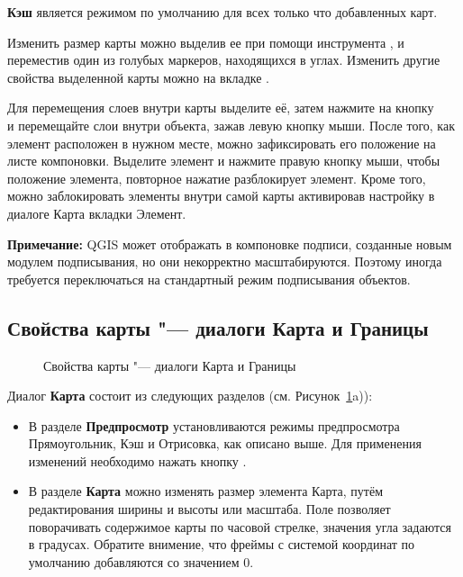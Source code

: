 \textbf{Кэш} является режимом по умолчанию для всех только что
добавленных карт.

Изменить размер карты можно выделив ее при помощи инструмента
,
и переместив один из голубых маркеров, находящихся в углах. Изменить
другие свойства выделенной карты можно на вкладке .

Для перемещения слоев внутри карты выделите её, затем нажмите на кнопку \\
 и
перемещайте слои внутри объекта, зажав левую кнопку мыши.
После того, как элемент расположен в нужном месте, можно зафиксировать
его положение на листе компоновки. Выделите элемент и нажмите правую
кнопку мыши, чтобы  положение
элемента, повторное нажатие разблокирует элемент. Кроме того, можно
заблокировать элементы внутри самой карты активировав настройку
 в диалоге Карта вкладки
Элемент.

\textbf{Примечание:} QGIS \CURRENT может отображать в компоновке подписи,
созданные новым модулем подписывания, но они некорректно масштабируются.
Поэтому иногда требуется переключаться на стандартный режим подписывания
объектов.

\subsection{Свойства карты "--- диалоги Карта и Границы}

\begin{figure}[ht]
  \centering
    \hspace{1cm}
  \caption{Свойства карты "--- диалоги Карта и Границы \wincaption}\label{fig:mapdialog}
\end{figure}


Диалог \textbf{Карта} состоит из следующих разделов
(см. Рисунок~\ref{fig:mapdialog}a)):

\begin{itemize}[label=--]
\item В разделе \textbf{Предпросмотр} установливаются режимы
предпросмотра Прямоугольник, Кэш и Отрисовка, как описано выше. Для
применения изменений необходимо нажать кнопку .
\item В разделе \textbf{Карта} можно изменять размер элемента Карта,
путём редактирования ширины и высоты или масштаба. Поле
 позволяет поворачивать содержимое карты
по часовой стрелке, значения угла задаются в градусах. Обратите
внимение, что фреймы с системой координат по умолчанию добавляются со
значением 0.
\end{itemize}

